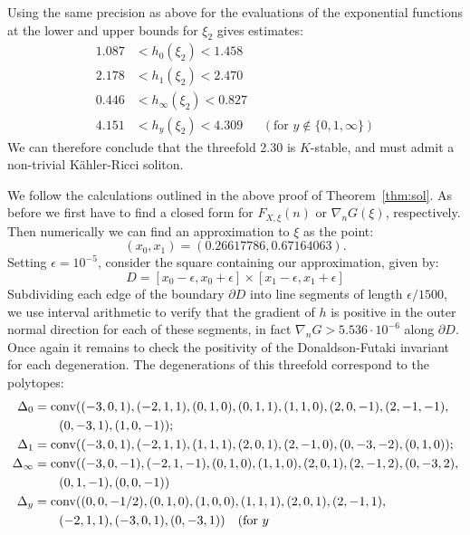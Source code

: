 \begin{example}
Using the same precision as above for the  evaluations of the exponential functions at the lower and upper bounds for \(\xi_2\) gives estimates:
\begin{align*}
1.087 &< h_0(\xi_2) < 1.458 \\
2.178 &< h_1(\xi_2) < 2.470 \\
0.446 &< h_\infty(\xi_2) < 0.827 \\
4.151 &< h_y(\xi_2) < 4.309 \ \ \ \ \ \ \   \left( \text{for } y \not \in \{0,1,\infty\} \right)
\end{align*}
We can therefore conclude that the threefold 2.30 is \(K\)-stable, and must admit a non-trivial K\"ahler-Ricci soliton.
\end{example}

\begin{example}
\label{exp:asymetric}
We follow the calculations outlined in the above proof of Theorem~\ref{thm:sol}. As before we first have to find a closed form for $F_{X,\xi}(n)$ or $\nabla_n G(\xi)$, respectively. Then numerically we can find an approximation to \(\xi\) as the point:
\[
(x_0,x_1) = (0.26617786,  0.67164063).
\]
Setting \(\epsilon = 10^{-5}\), consider the square containing our approximation, given by:
\[
D = [x_0 - \epsilon,x_0+\epsilon] \times [x_1 - \epsilon, x_1 + \epsilon]
\]
Subdividing each edge of the boundary \(\partial D\) into line segments of length \(\epsilon/1500\), we use interval arithmetic to verify that the gradient of \(h\) is positive in the outer normal direction for each of these segments, in fact \(\nabla_n G > 5.536 \cdot 10^{-6}\) along \(\partial D\). Once again it remains to check the positivity of the Donaldson-Futaki invariant for each degeneration. The degenerations of this threefold correspond to the polytopes:
{
\
 \begin{align*}
\Delta_0 &= \conv((-3,0,1),(-2,1,1),(0,1,0),(0,1,1),(1,1,0),(2,0,-1),(2,-1,-1),\\
         &\qquad  (0,-3,1),(1,0,-1)); \\
\Delta_1 &= \conv((-3,0,1),(-2,1,1),(1,1,1),(2,0,1),(2,-1,0),(0,-3,-2),(0,1,0)); \\ 
\Delta_\infty &= \conv((-3,0,-1),(-2,1,-1),(0,1,0),(1,1,0),(2,0,1),(2,-1,2),(0,-3,2),\\
&\qquad (0,1,-1),(0,0,-1)) \\
\Delta_y &= \conv((0, 0, -1/2), (0, 1, 0), (1, 0, 0), (1, 1, 1), (2, 0, 1), (2, -1, 1), \\ & \qquad (-2, 1, 1), (-3, 0, 1), (0, -3, 1)) \ \ \  ( \text{for } y 

\end{align*}}
\end{example}
